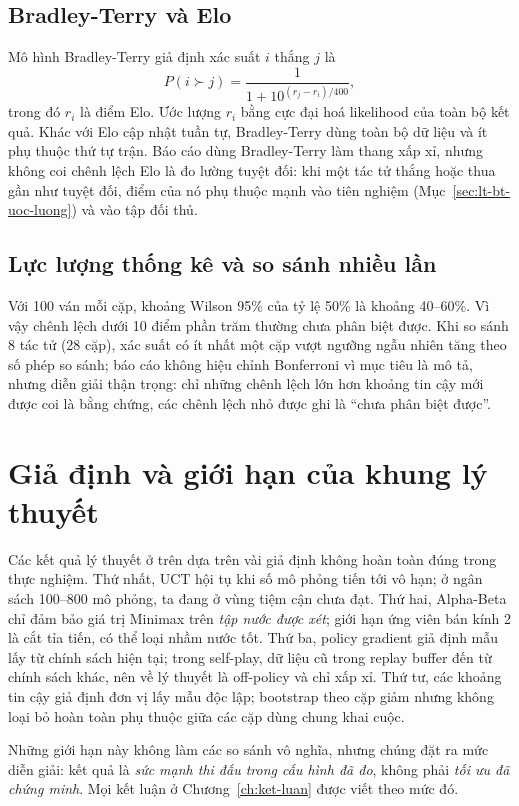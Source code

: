 \subsection{Bradley-Terry và Elo}
Mô hình Bradley-Terry giả định xác suất $i$ thắng $j$ là
\begin{equation}
  P(i\succ j)=\frac{1}{1+10^{(r_j-r_i)/400}},
  \label{eq:bt}
\end{equation}
trong đó $r_i$ là điểm Elo. Ước lượng $r_i$ bằng cực đại hoá likelihood của toàn bộ kết quả.
Khác với Elo cập nhật tuần tự, Bradley-Terry dùng toàn bộ dữ liệu và ít phụ thuộc thứ tự trận.
Báo cáo dùng Bradley-Terry làm thang xấp xỉ, nhưng không coi chênh lệch Elo là đo lường tuyệt
đối: khi một tác tử thắng hoặc thua gần như tuyệt đối, điểm của nó phụ thuộc mạnh vào tiên nghiệm
(Mục~\ref{sec:lt-bt-uoc-luong}) và vào tập đối thủ.

\subsection{Lực lượng thống kê và so sánh nhiều lần}
Với 100 ván mỗi cặp, khoảng Wilson 95\% của tỷ lệ 50\% là khoảng 40--60\%. Vì vậy chênh lệch
dưới 10 điểm phần trăm thường chưa phân biệt được. Khi so sánh 8 tác tử (28 cặp), xác suất có
ít nhất một cặp vượt ngưỡng ngẫu nhiên tăng theo số phép so sánh; báo cáo không hiệu chỉnh
Bonferroni vì mục tiêu là mô tả, nhưng diễn giải thận trọng: chỉ những chênh lệch lớn hơn
khoảng tin cậy mới được coi là bằng chứng, các chênh lệch nhỏ được ghi là ``chưa phân biệt
được''.

\section{Giả định và giới hạn của khung lý thuyết}
\label{sec:lt-gia-dinh}
Các kết quả lý thuyết ở trên dựa trên vài giả định không hoàn toàn đúng trong thực nghiệm.
Thứ nhất, UCT hội tụ khi số mô phỏng tiến tới vô hạn; ở ngân sách 100--800 mô phỏng, ta đang ở
vùng tiệm cận chưa đạt. Thứ hai, Alpha-Beta chỉ đảm bảo giá trị Minimax trên \emph{tập nước
được xét}; giới hạn ứng viên bán kính 2 là cắt tỉa tiến, có thể loại nhầm nước tốt. Thứ ba,
policy gradient giả định mẫu lấy từ chính sách hiện tại; trong self-play, dữ liệu cũ trong
replay buffer đến từ chính sách khác, nên về lý thuyết là off-policy và chỉ xấp xỉ. Thứ tư,
các khoảng tin cậy giả định đơn vị lấy mẫu độc lập; bootstrap theo cặp giảm nhưng không loại bỏ
hoàn toàn phụ thuộc giữa các cặp dùng chung khai cuộc.

Những giới hạn này không làm các so sánh vô nghĩa, nhưng chúng đặt ra mức diễn giải: kết quả
là \emph{sức mạnh thi đấu trong cấu hình đã đo}, không phải \emph{tối ưu đã chứng minh}. Mọi
kết luận ở Chương~\ref{ch:ket-luan} được viết theo mức đó.

